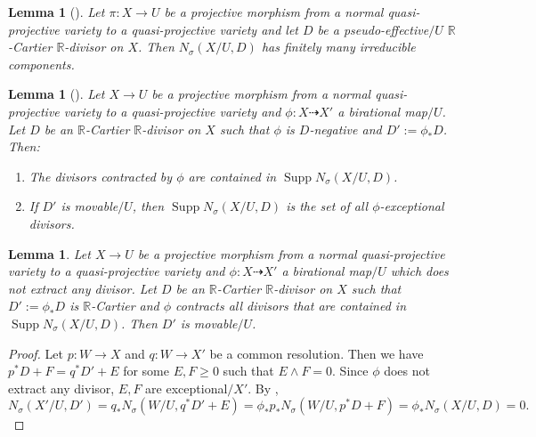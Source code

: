 \documentclass[12pt]{amsart}
\numberwithin{equation}{section}
\newcommand{\Rr}{\mathbb{R}}
\newcommand{\Supp}{\operatorname{Supp}}
\newtheorem{lem}[thm]{Lemma}
\theoremstyle{definition}
\theoremstyle{definition}
\theoremstyle{definition}
\begin{document}
\begin{lem}[{\cite[Lemma 3.5]{LX23}}]\label{lem: finiteness of sigmap}
Let $\pi: X\rightarrow U$ be a projective morphism from a normal quasi-projective variety to a quasi-projective variety and let $D$ be a pseudo-effective$/U$ $\Rr$-Cartier $\Rr$-divisor on $X$. Then $N_{\sigma}(X/U,D)$ has finitely many irreducible components. 
\end{lem}

\begin{lem}[{\cite[Lemma 2.25]{LMX24}}]\label{lem: nz for lc divisor}
Let $X\rightarrow U$ be a projective morphism from a normal quasi-projective variety to a quasi-projective variety and $\phi\colon X\dashrightarrow X'$ a birational map$/U$. Let $D$ be an $\Rr$-Cartier $\Rr$-divisor on $X$ such that $\phi$ is $D$-negative and $D':=\phi_\ast D$. Then:
\begin{enumerate}
    \item The divisors contracted by $\phi$ are contained in $\Supp N_{\sigma}(X/U,D)$.
    \item If $D'$ is movable$/U$, then $\Supp N_{\sigma}(X/U,D)$ is the set of all $\phi$-exceptional divisors.
    \end{enumerate}
\end{lem}

\begin{lem}\label{lem: if contract n then movable}
Let $X\rightarrow U$ be a projective morphism from a normal quasi-projective variety to a quasi-projective variety and $\phi: X\dashrightarrow X'$ a birational map$/U$ which does not extract any divisor. Let $D$ be an $\Rr$-Cartier $\Rr$-divisor on $X$ such that $D':=\phi_*D$ is $\Rr$-Cartier and $\phi$ contracts all divisors that are contained in  $\Supp N_{\sigma}(X/U,D)$. Then $D'$ is movable$/U$.
\end{lem}
\begin{proof}
Let $p: W\rightarrow X$ and $q\colon W\rightarrow X'$ be a common resolution. Then we have $p^*D+F=q^*D'+E$ for some $E,F\geq 0$ such that $E\wedge F=0$. Since $\phi$ does not extract any divisor, $E,F$ are exceptional$/X'$. By \cite[Lemma 3.4(3)]{LMX24}, 
$$N_{\sigma}(X'/U,D')=q_*N_{\sigma}(W/U,q^*D'+E)=\phi_*p_*N_{\sigma}(W/U,p^*D+F)=\phi_*N_{\sigma}(X/U,D)=0.$$
\end{proof}
\end{document}
